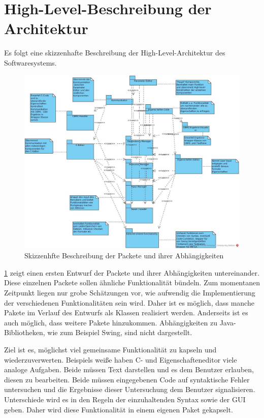 \documentclass[a4paper]{scrreprt}
\begin{document}
\section{High-Level-Beschreibung der Architektur}	
Es folgt eine skizzenhafte Beschreibung der High-Level-Architektur des Softwaresystems. 

\begin{figure}[H]
\includegraphics[scale=0.4]{architecture_first_scetch.jpg}
\caption{Skizzenhfte Beschreibung der Packete und ihrer Abhängigkeiten}
\label{Packet-scetch}
\end{figure}

\ref{Packet-scetch} zeigt einen ersten Entwurf der Packete und ihrer Abhängigkeiten untereinander. Diese einzelnen Packete sollen ähnliche Funktionalität bündeln. Zum momentanen Zeitpunkt liegen nur grobe Schätzungen vor, wie aufwendig die Implementierung der verschiedenen Funktionalitäten sein wird. Daher ist es möglich, dass manche Pakete im Verlauf des Entwurfs als Klassen realisiert werden. Anderseits ist es auch möglich, dass weitere Pakete hinzukommen. Abhängigkeiten zu Java-Bibliotheken, wie zum Beispiel Swing, sind nicht dargestellt.

Ziel ist es, möglichst  viel gemeinsame Funktionalität zu kapseln und wiederzuverwerten. Beispiels weiße haben C- und Eigenschafteneditor viele analoge Aufgaben. Beide müssen Text darstellen und es dem Benutzer erlauben, diesen zu bearbeiten. Beide müssen eingegebenen Code auf syntaktische Fehler untersuchen und die Ergebnisse dieser Untersuchung dem Benutzer signalisieren. Unterschiede wird es in den Regeln der einzuhaltenden Syntax sowie der \ac{GUI} geben. Daher wird diese Funktionalität in einem eigenen Paket gekapselt. 
\end{document}
